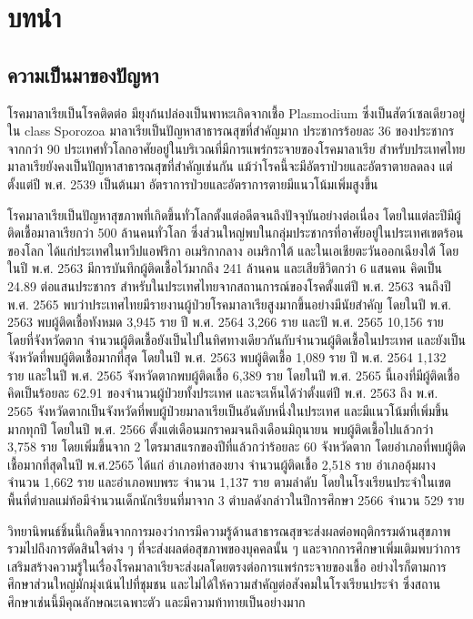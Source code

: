 \section{บทนำ}

\subsection{ความเป็นมาของปัญหา}
โรคมาลาเรียเป็นโรคติดต่อ มียุงก้นปล่องเป็นพาหะเกิดจากเชื้อ Plasmodium ซึ่งเป็นสัตว์เซลเดียวอยู่ใน class Sporozoa มาลาเรียเป็นปัญหาสาธารณสุขที่สำคัญมาก ประชากรร้อยละ 36 ของประชากรจากกว่า 90 ประเทศทั่วโลกอาศัยอยู่ในบริเวณที่มีการแพร่กระจายของโรคมาลาเรีย สำหรับประเทศไทยมาลาเรียยังคงเป็นปัญหาสาธารณสุขที่สำคัญเช่นกัน แม้ว่าโรคนี้จะมีอัตราป่วยและอัตราตายลดลง แต่ตั้งแต่ปี พ.ศ. 2539 เป็นต้นมา อัตราการป่วยและอัตราการตายมีแนวโน้มเพิ่มสูงขึ้น

โรคมาลาเรียเป็นปัญหาสุขภาพที่เกิดขึ้นทั่วโลกตั้งแต่อดีตจนถึงปัจจุบันอย่างต่อเนื่อง โดยในแต่ละปีมีผู้ติดเชื้อมาลาเรียกว่า 500 ล้านคนทั่วโลก ซึ่งส่วนใหญ่พบในกลุ่มประชากรที่อาศัยอยู่ในประเทศเขตร้อนของโลก ได้แก่ประเทศในทวีปแอฟริกา อเมริกากลาง อเมริกาใต้ และในเอเชียตะวันออกเฉียงใต้ โดยในปี พ.ศ. 2563 มีการบันทึกผู้ติดเชื้อไว้มากถึง 241 ล้านคน และเสียชีวิตกว่า 6 แสนคน คิดเป็น 24.89 ต่อแสนประชากร สำหรับในประเทศไทยจากสถานการณ์ของโรคตั้งแต่ปี พ.ศ. 2563 จนถึงปี พ.ศ. 2565 พบว่าประเทศไทยมีรายงานผู้ป่วยโรคมาลาเรียสูงมากขึ้นอย่างมีนัยสำคัญ โดยในปี พ.ศ. 2563 พบผู้ติดเชื้อทังหมด 3,945 ราย ปี พ.ศ. 2564 3,266 ราย และปี พ.ศ. 2565 10,156 ราย โดยที่จังหวัดตาก จำนวนผู้ติดเชื้อยังเป็นไปในทิศทางเดียวกันกับจำนวนผู้ติดเชื้อในประเทศ และยังเป็นจังหวัดที่พบผู้ติดเชื้อมากที่สุด โดยในปี พ.ศ. 2563 พบผู้ติดเชื้อ 1,089 ราย ปี พ.ศ. 2564 1,132 ราย และในปี พ.ศ. 2565 จังหวัดตากพบผู้ติดเชื้อ 6,389 ราย  โดยในปี พ.ศ. 2565 นี้เองที่มีผู้ติดเชื้อคิดเป็นร้อยละ 62.91 ของจำนวนผู้ป่วยทั้งประเทศ และจะเห็นได้ว่าตั้งแต่ปี พ.ศ. 2563 ถึง พ.ศ. 2565 จังหวัดตากเป็นจังหวัดที่พบผู้ป่วยมาลาเรียเป็นอันดับหนึ่งในประเทศ และมีแนวโน้มที่เพิ่มขึ้นมากทุกปี โดยในปี พ.ศ. 2566 ตั้งแต่เดือนมกราคมจนถึงเดือนมิถุนายน พบผู้ติดเชื้อไปแล้วกว่า 3,758 ราย โดยเพิ่มขึ้นจาก 2 ไตรมาสแรกของปีที่แล้วกว่าร้อยละ 60 จังหวัดตาก โดยอำเภอที่พบผู้ติดเชื้อมากที่สุดในปี พ.ศ.2565 ได้แก่ อำเภอท่าสองยาง จำนวนผู้ติดเชื้อ 2,518 ราย อำเภออุ้มผาง จำนวน 1,662 ราย และอำเภอพบพระ จำนวน 1,137 ราย ตามลำดับ โดยในโรงเรียนประจำในเขตพื้นที่ตำบลแม่ท้อมีจำนวนเด็กนักเรียนที่มาจาก 3 ตำบลดังกล่าวในปีการศึกษา 2566 จำนวน 529 ราย

วิทยานิพนธ์ชิ้นนี้เกิดขึ้นจากการมองว่าการมีความรู้ด้านสาธารณสุขจะส่งผลต่อพฤติกรรมด้านสุขภาพ รวมไปถึงการตัดสินใจต่าง ๆ ที่จะส่งผลต่อสุขภาพของบุคคลนั้น ๆ และจากการศึกษาเพิ่มเติมพบว่าการเสริมสร้างความรู้ในเรื่องโรคมาลาเรียจะส่งผลโดยตรงต่อการแพร่กระจายของเชื้อ อย่างไรก็ตามการศึกษาส่วนใหญ่มักมุ่งเน้นไปที่ชุมชน และไม่ได้ให้ความสำคัญต่อสังคมในโรงเรียนประจำ ซึ่งสถานศึกษาเช่นนี้มีคุณลักษณะเฉพาะตัว และมีความท้าทายเป็นอย่างมาก

